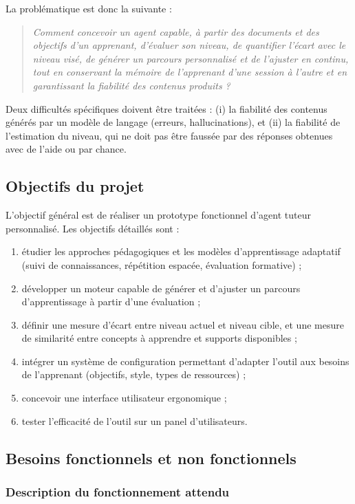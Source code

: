 \documentclass[11pt,a4paper]{article}
\begin{document}
La problématique est donc la suivante :
\begin{quote}
\textit{Comment concevoir un agent capable, à partir des documents et des objectifs d'un apprenant, d'évaluer son niveau, de quantifier l'écart avec le niveau visé, de générer un parcours personnalisé et de l'ajuster en continu, tout en conservant la mémoire de l'apprenant d'une session à l'autre et en garantissant la fiabilité des contenus produits ?}
\end{quote}

Deux difficultés spécifiques doivent être traitées : (i) la fiabilité des contenus générés par un modèle de langage (erreurs, hallucinations), et (ii) la fiabilité de l'estimation du niveau, qui ne doit pas être faussée par des réponses obtenues avec de l'aide ou par chance.

\subsection{Objectifs du projet}

L'objectif général est de réaliser un prototype fonctionnel d'agent tuteur personnalisé. Les objectifs détaillés sont :
\begin{enumerate}[noitemsep]
  \item étudier les approches pédagogiques et les modèles d'apprentissage adaptatif (suivi de connaissances, répétition espacée, évaluation formative) ;
  \item développer un moteur capable de générer et d'ajuster un parcours d'apprentissage à partir d'une évaluation ;
  \item définir une mesure d'écart entre niveau actuel et niveau cible, et une mesure de similarité entre concepts à apprendre et supports disponibles ;
  \item intégrer un système de configuration permettant d'adapter l'outil aux besoins de l'apprenant (objectifs, style, types de ressources) ;
  \item concevoir une interface utilisateur ergonomique ;
  \item tester l'efficacité de l'outil sur un panel d'utilisateurs.
\end{enumerate}

\subsection{Besoins fonctionnels et non fonctionnels}
\label{sec:besoins}

\subsubsection{Description du fonctionnement attendu}
\end{document}
